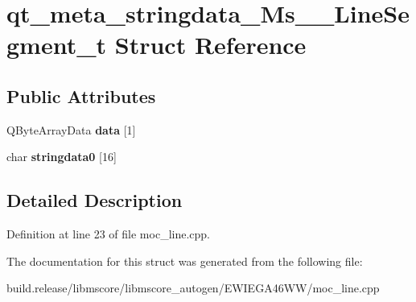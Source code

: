 \hypertarget{structqt__meta__stringdata___ms_____line_segment__t}{}\section{qt\+\_\+meta\+\_\+stringdata\+\_\+\+Ms\+\_\+\+\_\+\+Line\+Segment\+\_\+t Struct Reference}
\label{structqt__meta__stringdata___ms_____line_segment__t}
\subsection*{Public Attributes}
\begin{DoxyCompactItemize}
\item 
\mbox{\label{structqt__meta__stringdata___ms_____line_segment__t_ab6bfade307ff055b130fb011a20bcd92}} 
Q\+Byte\+Array\+Data {\bfseries data} \mbox{[}1\mbox{]}
\item 
\mbox{\label{structqt__meta__stringdata___ms_____line_segment__t_a59af6a04d732cc73f2b7bb8b9a4468bc}} 
char {\bfseries stringdata0} \mbox{[}16\mbox{]}
\end{DoxyCompactItemize}


\subsection{Detailed Description}


Definition at line 23 of file moc\+\_\+line.\+cpp.



The documentation for this struct was generated from the following file\+:\begin{DoxyCompactItemize}
\item 
build.\+release/libmscore/libmscore\+\_\+autogen/\+E\+W\+I\+E\+G\+A46\+W\+W/moc\+\_\+line.\+cpp\end{DoxyCompactItemize}
